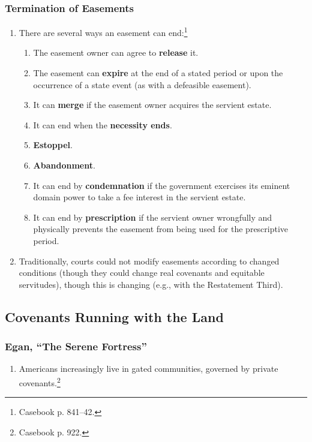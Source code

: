 \subsubsection{Termination of Easements}

\begin{enumerate}
    \item There are several ways an easement can end:\footnote{Casebook p. 
    841--42.}
    \begin{enumerate}
        \item The easement owner can agree to \textbf{release} it.
        \item The easement can \textbf{expire} at the end of a stated period 
        or upon the occurrence of a state event (as with a defeasible 
        easement).
        \item It can \textbf{merge} if the easement owner acquires the 
        servient estate.
        \item It can end when the \textbf{necessity ends}.
        \item \textbf{Estoppel}.
        \item \textbf{Abandonment}.
        \item It can end by \textbf{condemnation} if the government exercises 
        its eminent domain power to take a fee interest in the servient 
        estate.
        \item It can end by \textbf{prescription} if the servient owner 
        wrongfully and physically prevents the easement from being used for 
        the prescriptive period.
    \end{enumerate}
    \item Traditionally, courts could not modify easements according to 
    changed conditions (though they could change real covenants and equitable 
    servitudes), though this is changing (e.g., with the Restatement Third).
\end{enumerate}

\subsection{Covenants Running with the Land}

\subsubsection{Egan, ``The Serene Fortress''}

\begin{enumerate}
    \item Americans increasingly live in gated communities, governed by 
    private covenants.\footnote{Casebook p. 922.}
\end{enumerate}

